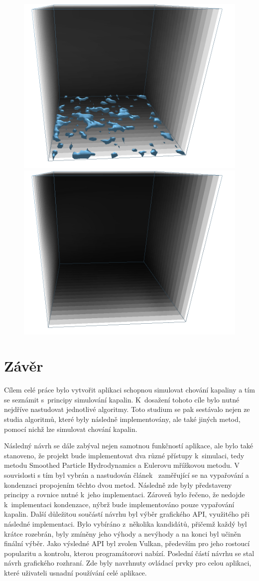 \begin{figure}[h]
	\includegraphics[width=0.3\linewidth]{obrazky-figures/app/Evap07.jpg}
	\includegraphics[width=0.3\linewidth]{obrazky-figures/app/Evap08.jpg}\hfill
	\label{fig:evapSim}
\end{figure}

\chapter{Závěr}
\label{chapter:zaver}

Cílem celé práce bylo vytvořit aplikaci schopnou simulovat chování kapaliny a tím se seznámit s~principy simulování kapalin. K~dosažení tohoto cíle bylo nutné nejdříve nastudovat jednotlivé algoritmy. Toto studium se pak sestávalo nejen ze studia algoritmů, které byly následně implementovány, ale také jiných metod, pomocí nichž lze simulovat chování kapalin.

Následný návrh se dále zabýval nejen samotnou funkčností aplikace, ale bylo také stanoveno, že projekt bude implementovat dva různé přístupy k~simulaci, tedy metodu Smoothed Particle Hydrodynamics a Eulerovu mřížkovou metodu. V souvislosti s tím byl vybrán a nastudován článek~\cite{Evap&Cond} zaměřující se na vypařování a kondenzaci propojením těchto dvou metod. Následně zde byly představeny principy a rovnice nutné k~jeho implementaci. Zároveň bylo řečeno, že nedojde k~implementaci kondenzace, nýbrž bude implementováno pouze vypařování kapalin. Další důležitou součástí návrhu byl výběr grafického API, využitého při následné implementaci. Bylo vybíráno z~několika kandidátů, přičemž každý byl krátce rozebrán, byly zmíněny jeho výhody a nevýhody a na konci byl učiněn finální výběr. Jako výsledné API byl zvolen Vulkan, především pro jeho rostoucí popularitu a kontrolu, kterou programátorovi nabízí. Poslední částí návrhu se stal návrh grafického rozhraní. Zde byly navrhnuty ovládací prvky pro celou aplikaci, které uživateli usnadní používání celé aplikace.

